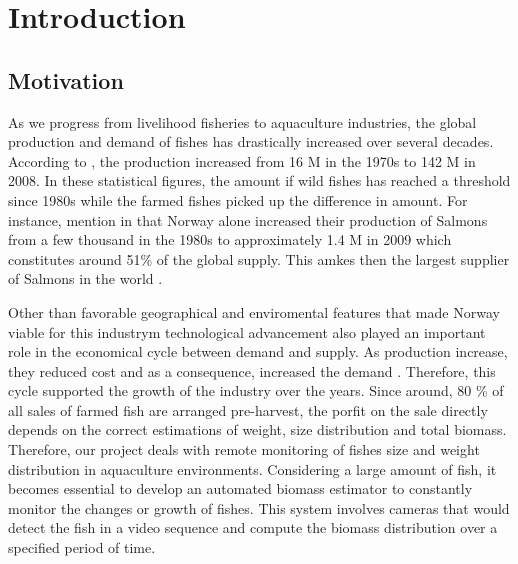 \chapter{Introduction}
\label{chapter:Introduction}



 
\section{Motivation}
As we progress from livelihood fisheries to aquaculture industries, the global 
production and demand of fishes has drastically increased over several decades. 
According to \cite{Asche2011}, the production increased from 16 M in the 1970s to 
142 M in 2008. In these statistical figures, the amount if wild fishes has reached 
a threshold since 1980s while the farmed fishes picked up the difference in amount.
For instance, \citeauthor{LARSEN2011a} mention in \citeyearpar{LARSEN2011a} that Norway 
alone increased their production of Salmons from a few thousand in the 1980s to 
approximately 1.4 M in 2009 which constitutes around 51\% of the global supply. 
This amkes then the largest supplier of Salmons in the world \citep{Asche2011, LARSEN2011a, Liu2011}.

Other than favorable geographical and enviromental features that made Norway viable 
for this industrym technological advancement also played an important role in the 
economical cycle between demand and supply. As production increase, they reduced 
cost and as a consequence, increased the demand \cite{Asche2011}. Therefore, this cycle 
supported the growth of the industry over the years.
Since around, 80 \% of all sales of farmed fish are arranged pre-harvest, the porfit 
on the sale directly depends on the correct estimations of weight, size distribution 
and total biomass. Therefore, our project deals with remote monitoring of fishes size 
and weight distribution in aquaculture environments. Considering a large amount of fish, 
it becomes essential to develop an automated biomass estimator to constantly monitor 
the changes or growth of fishes. This system involves cameras that would detect the 
fish in a video sequence and compute the biomass distribution over a specified period 
of time.

